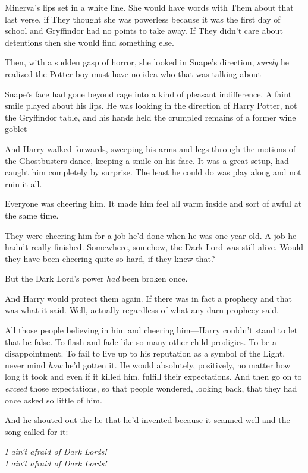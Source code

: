 Minerva's lips set in a white line. She would have words with Them about that
last verse, if They thought she was powerless because it was the first day of
school and Gryffindor had no points to take away. If They didn't care about
detentions then she would find something else.

Then, with a sudden gasp of horror, she looked in Snape's direction,
\emph{surely} he realized the Potter boy must have no idea who that was talking
about---

Snape's face had gone beyond rage into a kind of pleasant indifference. A faint
smile played about his lips. He was looking in the direction of Harry Potter,
not the Gryffindor table, and his hands held the crumpled remains of a former
wine goblet{\el}

And Harry walked forwards, sweeping his arms and legs through the motions of
the Ghostbusters dance, keeping a smile on his face. It was a great setup, had
caught him completely by surprise. The least he could do was play along and not
ruin it all.

Everyone was cheering him. It made him feel all warm inside and sort of awful
at the same time.

They were cheering him for a job he'd done when he was one year old. A job he
hadn't really finished. Somewhere, somehow, the Dark Lord was still alive.
Would they have been cheering quite so hard, if they knew that?

But the Dark Lord's power \emph{had} been broken once.

And Harry would protect them again. If there was in fact a prophecy and that
was what it said. Well, actually regardless of what any darn prophecy said.

All those people believing in him and cheering him---Harry couldn't stand to
let that be false. To flash and fade like so many other child prodigies. To be
a disappointment. To fail to live up to his reputation as a symbol of the
Light, never mind \emph{how} he'd gotten it. He would absolutely, positively,
no matter how long it took and even if it killed him, fulfill their
expectations. And then go on to \emph{exceed} those expectations, so that
people wondered, looking back, that they had once asked so little of him.

And he shouted out the lie that he'd invented because it scanned well and the
song called for it:

\begin{center}
\emph{I ain't afraid of Dark Lords!\\
I ain't afraid of Dark Lords!}
\end{center}

